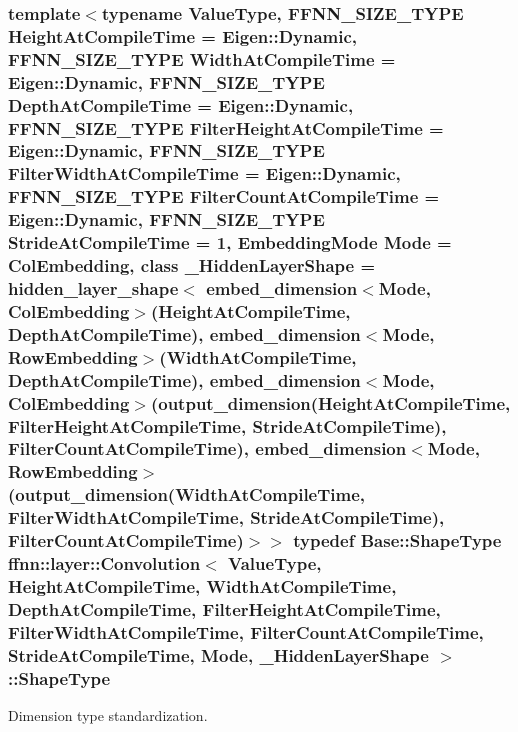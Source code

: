 \hypertarget{classffnn_1_1layer_1_1_convolution_af048fd677e8749bb295fac8d330ad843}{
\subsubsection[{Shape\-Type}]{\setlength{\rightskip}{0pt plus 5cm}template$<$typename Value\-Type, F\-F\-N\-N\-\_\-\-S\-I\-Z\-E\-\_\-\-T\-Y\-P\-E Height\-At\-Compile\-Time = Eigen\-::\-Dynamic, F\-F\-N\-N\-\_\-\-S\-I\-Z\-E\-\_\-\-T\-Y\-P\-E Width\-At\-Compile\-Time = Eigen\-::\-Dynamic, F\-F\-N\-N\-\_\-\-S\-I\-Z\-E\-\_\-\-T\-Y\-P\-E Depth\-At\-Compile\-Time = Eigen\-::\-Dynamic, F\-F\-N\-N\-\_\-\-S\-I\-Z\-E\-\_\-\-T\-Y\-P\-E Filter\-Height\-At\-Compile\-Time = Eigen\-::\-Dynamic, F\-F\-N\-N\-\_\-\-S\-I\-Z\-E\-\_\-\-T\-Y\-P\-E Filter\-Width\-At\-Compile\-Time = Eigen\-::\-Dynamic, F\-F\-N\-N\-\_\-\-S\-I\-Z\-E\-\_\-\-T\-Y\-P\-E Filter\-Count\-At\-Compile\-Time = Eigen\-::\-Dynamic, F\-F\-N\-N\-\_\-\-S\-I\-Z\-E\-\_\-\-T\-Y\-P\-E Stride\-At\-Compile\-Time = 1, Embedding\-Mode Mode = Col\-Embedding, class \-\_\-\-Hidden\-Layer\-Shape = hidden\-\_\-layer\-\_\-shape$<$              embed\-\_\-dimension$<$\-Mode, Col\-Embedding$>$(\-Height\-At\-Compile\-Time, Depth\-At\-Compile\-Time),              embed\-\_\-dimension$<$\-Mode, Row\-Embedding$>$(\-Width\-At\-Compile\-Time,  Depth\-At\-Compile\-Time),              embed\-\_\-dimension$<$\-Mode, Col\-Embedding$>$(output\-\_\-dimension(\-Height\-At\-Compile\-Time, Filter\-Height\-At\-Compile\-Time, Stride\-At\-Compile\-Time), Filter\-Count\-At\-Compile\-Time),              embed\-\_\-dimension$<$\-Mode, Row\-Embedding$>$(output\-\_\-dimension(\-Width\-At\-Compile\-Time,  Filter\-Width\-At\-Compile\-Time,  Stride\-At\-Compile\-Time), Filter\-Count\-At\-Compile\-Time)$>$$>$ typedef {\bf Base\-::\-Shape\-Type} {\bf ffnn\-::layer\-::\-Convolution}$<$ Value\-Type, Height\-At\-Compile\-Time, Width\-At\-Compile\-Time, Depth\-At\-Compile\-Time, Filter\-Height\-At\-Compile\-Time, Filter\-Width\-At\-Compile\-Time, Filter\-Count\-At\-Compile\-Time, Stride\-At\-Compile\-Time, Mode, \-\_\-\-Hidden\-Layer\-Shape $>$\-::{\bf Shape\-Type}}}\label{classffnn_1_1layer_1_1_convolution_af048fd677e8749bb295fac8d330ad843}


Dimension type standardization. 

